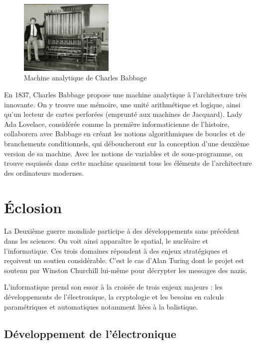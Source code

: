 \documentclass[a4paper,11pt]{book}
\begin{document}
\begin{figure} 
    \centering
    \includegraphics[width=0.4\textwidth]{media/machines/Babbage-1-450x355.png}
    \caption{Machine analytique de Charles Babbage}
\end{figure}

En 1837, Charles Babbage propose une machine analytique à l'architecture très innovante. On y trouve une mémoire, une unité arithmétique et logique, ainsi qu'un lecteur de cartes perforées (emprunté aux machines de Jacquard). Lady Ada Lovelace, considérée comme la première informaticienne de l'histoire, collaborera avec Babbage en créant les notions algorithmiques de boucles et de branchements conditionnels, qui déboucheront sur la conception d'une deuxième version de sa machine. Avec les notions de variables et de sous-programme, on trouve esquissés dans cette machine quasiment tous les éléments de l'architecture des ordinateurs modernes.

\section{Éclosion}
La Deuxième guerre mondiale participe à des développements sans précédent dans les sciences. On voit ainsi apparaître le spatial, le nucléaire et l'informatique. Ces trois domaines répondent à des enjeux stratégiques et reçoivent un soutien considérable. C'est le cas d'Alan Turing dont le projet est soutenu par Winston Churchill lui-même pour décrypter les messages des nazis.

L'informatique prend son essor à la croisée de trois enjeux majeurs : les développements de l'électronique, la cryptologie et les besoins en calculs paramétriques et automatiques notamment liées à la balistique. 

\subsection{Développement de l'électronique}
\end{document}
